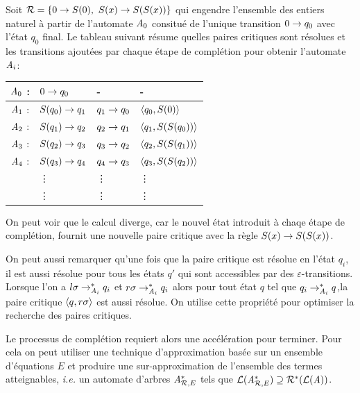 \begin{example}
  Soit $\mathcal R = \{0 \rightarrow S(0),\ S(x) \rightarrow S(S(x))\}$ qui engendre l'ensemble des entiers naturel
  à partir de l'automate $\mathit A_0$ consitué de l'unique transition $0 \rightarrow q_0$ avec l'état $q_0$ final.
  Le tableau suivant résume quelles paires critiques sont résolues et les transitions ajoutées par chaque étape de complétion
  pour obtenir l'automate $\mathit A_i$:
  \begin{center}
    \begin{tabular}{|cll||l|}
      \hline
      $\mathit A_0$ : & $0 \rightarrow q_0$ & - & - \\
      \hline
      $\mathit A_1$ : & $S (q_0) \rightarrow q_1$ & $q_1 \rightarrow q_0$ & $\langle q_0, S(0)\rangle$\\
      \hline
      $\mathit A_2$ : & $S (q_1) \rightarrow q_2$ & $q_2 \rightarrow q_1$ & $\langle q_1, S(S(q_0))\rangle$\\
      \hline
      $\mathit A_3$ : & $S (q_2) \rightarrow q_3$ & $q_3 \rightarrow q_2$ & $\langle q_2, S(S(q_1))\rangle$\\
      \hline
      $\mathit A_4$ : & $S (q_3) \rightarrow q_4$ & $q_4 \rightarrow q_3$ & $\langle q_3, S(S(q_2))\rangle$\\
      & \vdots & \vdots & \vdots \\
      & \vdots & \vdots & \vdots \\
      \hline
    \end{tabular}
  \end{center}

  On peut voir que le calcul diverge, car le nouvel état introduit
  à chaqe étape de complétion, fournit une nouvelle paire critique avec la règle $S(x) \rightarrow S(S(x))$.

  On peut aussi remarquer qu'une fois que la paire critique est résolue en l'état $q_i$,
  il est aussi résolue pour tous les états $q'$ qui sont accessibles par des $\varepsilon$-transitions.
  Lorsque l'on a $l\sigma \rightarrow^*_{\mathit A_i} q_i$ et $r\sigma \rightarrow^*_{\mathit A_i} q_i$ alors pour tout état $q$ tel
  que $q_i \rightarrow^*_{\mathit A_i} q$,la paire critique $\langle q, r\sigma\rangle$ est aussi résolue. On utilise cette
  propriété pour optimiser la recherche des paires critiques.
\end{example}


Le processus de complétion requiert alors une accélération pour terminer. Pour cela on peut
utiliser une technique d'approximation basée sur un ensemble d'équations $E$ et produire 
une sur-approximation de l'ensemble des termes atteignables, \textit{i.e.} un automate d'arbres
$\mathit A^*_{\mathcal R,E}$ tels que $\mathcal{L}(\mathit A^*_{\mathcal R,E}) \supseteq \mathcal R^*(\mathcal{L}(\mathit A))$.

